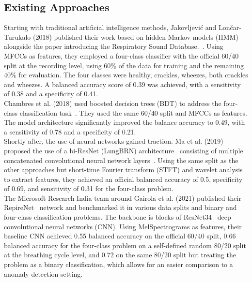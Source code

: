 \subsection{Existing Approaches}
Starting with traditional artificial intelligence methods, Jakovljevi{\'c} and Lon{\v{c}}ar-Turukalo (2018) published their work based on hidden Markov models (HMM) alongside the paper introducing the Respiratory Sound Database.~\cite{jakovljevic2018hidden}. Using MFCCs as features, they employed a four-class classifier with the official 60/40 split at the recording level, using 60\% of the data for training and the remaining 40\% for evaluation. The four classes were healthy, crackles, wheezes, both crackles and wheezes. A balanced accuracy score of 0.39 was achieved, with a sensitivity of 0.38 and a specificity of 0.41.\\
Chambres et al. (2018) used boosted decision trees (BDT) to address the four-class classification task~\cite{chambres2018automatic}. They used the same 60/40 split and MFCCs as features. The model architecture significantly improved the balance accuracy to 0.49, with a sensitivity of 0.78 and a specificity of 0.21.\\
Shortly after, the use of neural networks gained traction. Ma et al. (2019) proposed the use of a bi-ResNet (LungBRN) architecture~\cite{wang2019bi} consisting of multiple concatenated convolutional neural network layers~\cite{ma2019lungbrn}. Using the same split as the other approaches but short-time Fourier transform (STFT) and wavelet analysis to extract features, they achieved an official balanced accuracy of 0.5, specificity of 0.69, and sensitivity of 0.31 for the four-class problem.\\
The Microsoft Research India team around Gairola et al. (2021) published their RepireNet~\cite{gairola2021respirenet} network and benchmarked it in various data splits and binary and four-class classification problems. The backbone is blocks of ResNet34~\cite{he2016deep} deep convolutional neural networks (CNN). Using MelSpectrograms as features, their baseline CNN achieved 0.55 balanced accuracy on the official 60/40 split, 0.66 balanced accuracy for the four-class problem on a self-defined random 80/20 split at the breathing cycle level, and 0.72 on the same 80/20 split but treating the problem as a binary classification, which allows for an easier comparison to a anomaly detection setting.\\
